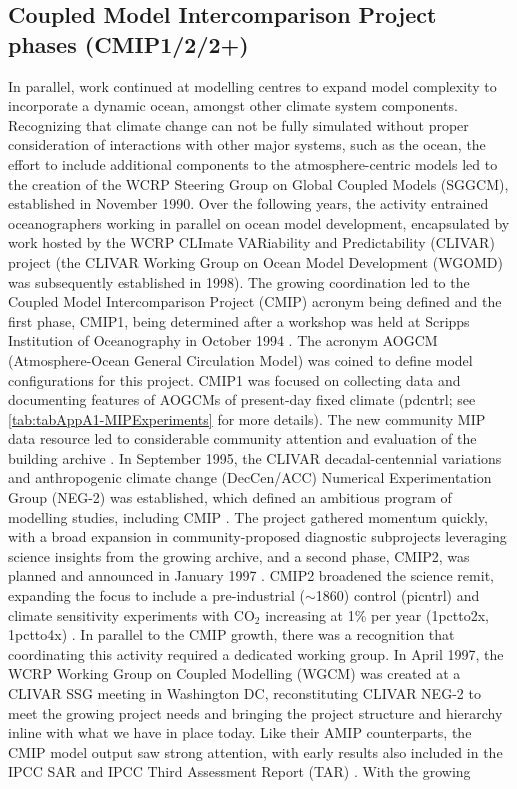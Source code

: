 \documentclass[gmd, preprint]{copernicus}
\begin{document}
\subsection{Coupled Model Intercomparison Project phases (CMIP1/2/2+)}
\label{sec:cmip1And2And2Plus}
In parallel, work continued at modelling centres to expand model complexity to incorporate a dynamic ocean, amongst other climate system components. Recognizing that climate change can not be fully simulated without proper consideration of interactions with other major systems, such as the ocean, the effort to include additional components to the atmosphere-centric models led to the creation of the WCRP Steering Group on Global Coupled Models (SGGCM), established in November 1990. Over the following years, the activity entrained oceanographers working in parallel on ocean model development, encapsulated by work hosted by the WCRP CLImate VARiability and Predictability (CLIVAR) project (the CLIVAR Working Group on Ocean Model Development (WGOMD) was subsequently established in 1998). The growing coordination led to the Coupled Model Intercomparison Project (CMIP) acronym being defined and the first phase, CMIP1, being determined after a workshop was held at Scripps Institution of Oceanography in October 1994 \citep{meehl_global_1995}. The acronym AOGCM (Atmosphere-Ocean General Circulation Model) was coined to define model configurations for this project. CMIP1 was focused on collecting data and documenting features of AOGCMs of present-day fixed climate (pdcntrl; see \autoref{tab:tabAppA1-MIPExperiments} for more details). The new community MIP data resource led to considerable community attention and evaluation of the building archive \citep{villwock_6th_2003, lambert_cmip1_2001, raisanen_co2-induced_2001}. In September 1995, the CLIVAR decadal-centennial variations and anthropogenic climate change (DecCen/ACC) Numerical Experimentation Group (NEG-2) was established, which defined an ambitious program of modelling studies, including CMIP \citep{villwock_what_1996, coughlan_report_1996}. The project gathered momentum quickly, with a broad expansion in community-proposed diagnostic subprojects leveraging science insights from the growing archive, and a second phase, CMIP2, was planned and announced in January 1997 \citep{meehl_intercomparison_1997, meehl_coupled_2000}. CMIP2 broadened the science remit, expanding the focus to include a pre-industrial ($\sim$1860) control (picntrl) and climate sensitivity experiments with CO$_{2}$ increasing at 1\% per year (1pctto2x, 1pctto4x) \citep{villwock_6th_2003, meehl_cmip_2003}. In parallel to the CMIP growth, there was a recognition that coordinating this activity required a dedicated working group. In April 1997, the WCRP Working Group on Coupled Modelling (WGCM) was created at a CLIVAR SSG meeting in Washington DC, reconstituting CLIVAR NEG-2 to meet the growing project needs \citep{detemmerman_clivar_1997} and bringing the project structure and hierarchy inline with what we have in place today. Like their AMIP counterparts, the CMIP model output saw strong attention, with early results also included in the IPCC SAR \citep{gates_climate_1996} and IPCC Third Assessment Report (TAR) \citep{mcavaney_model_2001}. With the growing 
\end{document}
